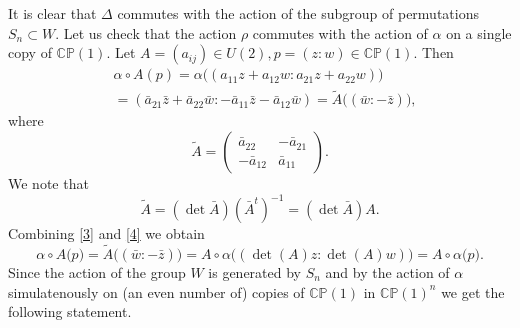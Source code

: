 \documentclass[11pt]{amsart}
\theoremstyle{definition}
\theoremstyle{remark}
\numberwithin{equation}{section}
\newcommand{\CP}{\mathbb{CP}}
\begin{document}
It is clear that $\Delta$ commutes with the action of the subgroup of permutations $S_n \subset W$. Let us check that the action $\rho$ commutes with the action of $\alpha$ on a single copy of $\CP(1)$. Let $A= (a_{ij}) \in U(2), p= (z:w) \in \CP(1)$. Then 
\begin{equation}
\label{3}
\begin{aligned} 
    &\alpha\circ A(p) = \alpha\big((a_{11}z+a_{12}w:a_{21}z+a_{22}w)\big)   \\
    &=(\bar{a}_{21}\bar{z}+\bar{a}_{22}\bar{w}:-\bar{a}_{11}\bar{z}-\bar{a}_{12}\bar{w}) = \widetilde{A}\big( (\bar{w}:-\bar{z})\big), 
\end{aligned}
\end{equation}
where
\[
\widetilde{A}=
\begin{pmatrix}
    \bar{a}_{22} &-\bar{a}_{21} \\
    -\bar{a}_{12} & \bar{a}_{11}
\end{pmatrix}.
\]
We note that 
\begin{equation}
\label{4}
\widetilde{A}=(\det\bar{A})(\bar{A}^t)^{-1}= (\det\bar{A})A.
\end{equation}
Combining \eqref{3} and \eqref{4} we obtain
\[
\alpha \circ A\big(p\big) = \widetilde{A}\big((\bar{w}:-\bar{z})\big) = A \circ \alpha \big((\det(A)z:\det(A)w)\big) = A \circ \alpha\big(p\big).
\]
Since the action of the group $W$ is generated by $S_n$ and by the action of $\alpha$ simulatenously on (an even number of) copies of $\CP(1)$ in $\CP(1)^n$ we get the following statement.
\end{document}
